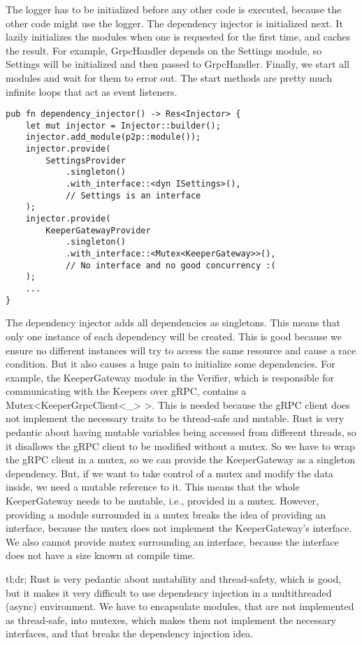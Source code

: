 \documentclass[ twoside,openright,titlepage,numbers=noenddot,headinclude,%
                footinclude=true,cleardoublepage=empty,abstractoff, %
                BCOR=5mm,paper=a4,fontsize=11pt,%
                ngerman,american,%
                ]{scrreprt}
\begin{document}
The logger has to be initialized before any other code is executed,
because the other code might use the logger.
The dependency injector is initialized next.
It lazily initializes the modules when one is requested for the first time, and caches the result.
For example, GrpcHandler depends on the Settings module,
so Settings will be initialized and then passed to GrpcHandler.
Finally, we start all modules and wait for them to error out.
The start methods are pretty much infinite loops that act as event listeners.

\begin{verbatim}
pub fn dependency_injector() -> Res<Injector> {
    let mut injector = Injector::builder();
    injector.add_module(p2p::module());
    injector.provide(
        SettingsProvider
            .singleton()
            .with_interface::<dyn ISettings>(),
            // Settings is an interface
    );
    injector.provide(
        KeeperGatewayProvider
            .singleton()
            .with_interface::<Mutex<KeeperGateway>>(),
            // No interface and no good concurrency :(
    );
    ...
}
\end{verbatim}

The dependency injector adds all dependencies as singletons.
This means that only one instance of each dependency will be created.
This is good because we ensure no different instances will try to access the same resource and cause a race condition.
But it also causes a huge pain to initialize some dependencies.
For example, the KeeperGateway module in the Verifier,
which is responsible for communicating with the Keepers over gRPC,
contains a Mutex<KeeperGrpcClient<\_> >.
This is needed because the gRPC client does not implement the necessary traits to be thread-safe and mutable.
Rust is very pedantic about having mutable variables being accessed from different threads,
so it disallows the gRPC client to be modified without a mutex.
So we have to wrap the gRPC client in a mutex, so we can provide the KeeperGateway as a singleton dependency.
But, if we want to take control of a mutex and modify the data inside, we need a mutable reference to it.
This means that the whole KeeperGateway needs to be mutable, i.e., provided in a mutex.
However, providing a module surrounded in a mutex breaks the idea of providing an interface,
because the mutex does not implement the KeeperGateway's interface.
We also cannot provide mutex surrounding an interface,
because the interface does not have a size known at compile time.

tl;dr; Rust is very pedantic about mutability and thread-safety,
which is good, but it makes it very difficult to use dependency injection in a multithreaded (async) environment.
We have to encapsulate modules, that are not implemented as thread-safe, into mutexes,
which makes them not implement the necessary interfaces, and that breaks the dependency injection idea.
\end{document}
